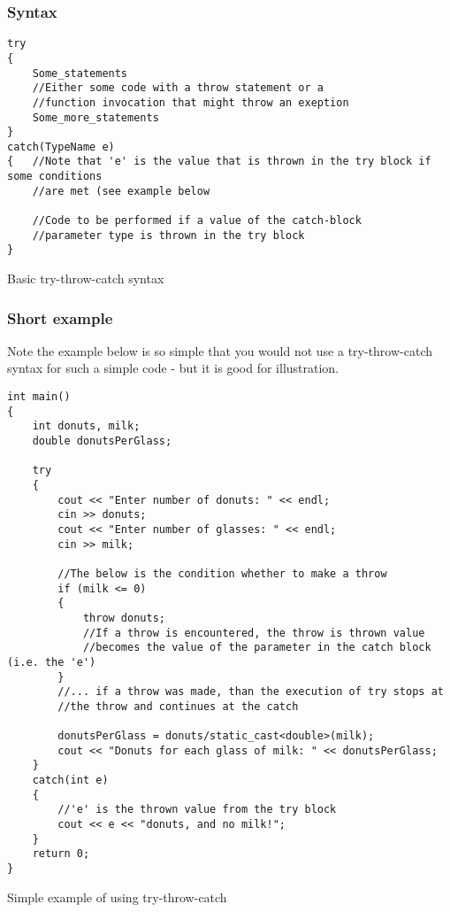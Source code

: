 \subsubsection*{Syntax}
\begin{listing}[H]
\begin{verbatim}
try
{
	Some_statements
	//Either some code with a throw statement or a
	//function invocation that might throw an exeption
	Some_more_statements
}
catch(TypeName e)
{	//Note that 'e' is the value that is thrown in the try block if some conditions
	//are met (see example below

	//Code to be performed if a value of the catch-block
	//parameter type is thrown in the try block
}
\end{verbatim}
\caption{Basic try-throw-catch syntax}
\label{source_code_1}
\end{listing}



\subsubsection*{Short example}
Note the example below is so simple that you would not use a try-throw-catch syntax for such
a simple code - but it is good for illustration.

\begin{listing}[H]
\begin{verbatim}
int main()
{
	int donuts, milk;
	double donutsPerGlass;
	
	try
	{
		cout << "Enter number of donuts: " << endl;
		cin >> donuts;
		cout << "Enter number of glasses: " << endl;
		cin >> milk;
		
		//The below is the condition whether to make a throw
		if (milk <= 0)
		{
			throw donuts;
			//If a throw is encountered, the throw is thrown value
			//becomes the value of the parameter in the catch block (i.e. the 'e')
		}
		//... if a throw was made, than the execution of try stops at
		//the throw and continues at the catch
		
		donutsPerGlass = donuts/static_cast<double>(milk);
		cout << "Donuts for each glass of milk: " << donutsPerGlass;
	}
	catch(int e)
	{
		//'e' is the thrown value from the try block
		cout << e << "donuts, and no milk!";
	}
	return 0;
}
\end{verbatim}
\caption{Simple example of using try-throw-catch}
\label{source_code_1}
\end{listing}





